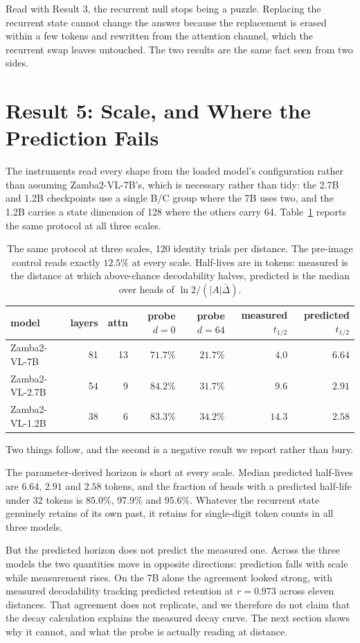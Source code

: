 \documentclass[11pt]{article}
\begin{document}
Read with Result 3, the recurrent null stops being a puzzle. Replacing the
recurrent state cannot change the answer because the replacement is erased
within a few tokens and rewritten from the attention channel, which the recurrent
swap leaves untouched. The two results are the same fact seen from two sides.
\section{Result 5: Scale, and Where the Prediction Fails}

The instruments read every shape from the loaded model's configuration rather
than assuming Zamba2-VL-7B's, which is necessary rather than tidy: the 2.7B and
1.2B checkpoints use a single B/C group where the 7B uses two, and the 1.2B
carries a state dimension of 128 where the others carry 64. Table~\ref{tab:scale}
reports the same protocol at all three scales.

\begin{table}[h]
\centering\small
\begin{tabular}{lrrrrrr}
\toprule
model & layers & attn & probe $d{=}0$ & probe $d{=}64$ & measured $t_{1/2}$ & predicted $t_{1/2}$ \\
\midrule
Zamba2-VL-7B   & 81 & 13 & $71.7\%$ & $21.7\%$ & $4.0$  & $6.64$ \\
Zamba2-VL-2.7B & 54 &  9 & $84.2\%$ & $31.7\%$ & $9.6$  & $2.91$ \\
Zamba2-VL-1.2B & 38 &  6 & $83.3\%$ & $34.2\%$ & $14.3$ & $2.58$ \\
\bottomrule
\end{tabular}
\caption{The same protocol at three scales, 120 identity trials per distance.
The pre-image control reads exactly $12.5\%$ at every scale. Half-lives are in
tokens: measured is the distance at which above-chance decodability halves,
predicted is the median over heads of $\ln 2/(|A|\bar{\Delta})$.}
\label{tab:scale}
\end{table}

Two things follow, and the second is a negative result we report rather than
bury.

The parameter-derived horizon is short at every scale. Median predicted
half-lives are $6.64$, $2.91$ and $2.58$ tokens, and the fraction of heads with
a predicted half-life under 32 tokens is $85.0\%$, $97.9\%$ and $95.6\%$. Whatever
the recurrent state genuinely retains of its own past, it retains for single-digit
token counts in all three models.

But the predicted horizon does not predict the measured one. Across the three
models the two quantities move in opposite directions: prediction falls with
scale while measurement rises. On the 7B alone the agreement looked strong, with
measured decodability tracking predicted retention at $r = 0.973$ across eleven
distances. That agreement does not replicate, and we therefore do not claim
that the decay calculation explains the measured decay curve. The next section
shows why it cannot, and what the probe is actually reading at distance.
\end{document}
